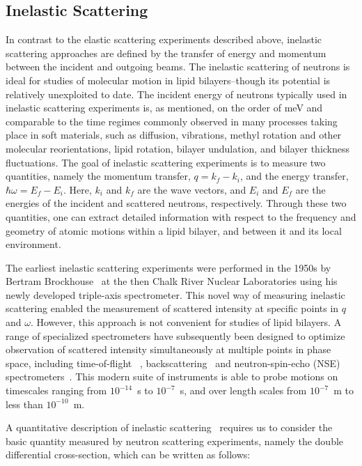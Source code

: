 \documentclass[8.5pt,twoside,twocolumn]{article}
\begin{document}
\subsection{Inelastic Scattering}\label{InES}
In contrast to the elastic scattering experiments described above, inelastic scattering approaches are defined by the transfer of energy and momentum between the incident and outgoing beams.  The inelastic scattering of neutrons is ideal for studies of molecular motion in lipid bilayers--though its potential is relatively unexploited to date. The incident energy of neutrons typically used in inelastic scattering experiments is, as mentioned, on the order of meV and comparable to the time regimes commonly observed in many processes taking place in soft materials, such as diffusion, vibrations, methyl rotation and other molecular reorientations, lipid rotation, bilayer undulation, and bilayer thickness fluctuations. The goal of inelastic scattering experiments is to measure two quantities, namely the momentum transfer, $q= k_f-k_i$, and the energy transfer, $\hbar\omega=E_f-E_i$.  Here, $k_i$ and $k_f$ are the wave vectors, and $E_i$ and $E_f$ are the energies of the incident and scattered neutrons, respectively. Through these two quantities, one can extract detailed information with respect to the frequency and geometry of atomic motions within a lipid bilayer, and between it and its local environment.  

The earliest inelastic scattering experiments were performed in the 1950s by Bertram Brockhouse~\cite{Brockhouse.1955} at the then Chalk River Nuclear Laboratories using his newly developed triple-axis spectrometer.  This novel way of measuring inelastic scattering enabled the measurement of scattered intensity at specific points in $q$ and $\omega$. However, this approach is not convenient for studies of lipid bilayers. A range of specialized spectrometers have subsequently been designed to optimize observation of scattered intensity simultaneously at multiple points in phase space, including time-of-flight ~\cite{Copley.1993}, backscattering~\cite{Maier.1966} and neutron-spin-echo (NSE) spectrometers~\cite{Mezei.1972}. This modern suite of instruments is able to probe motions on timescales ranging from $10^{-14}$~s to $10^{-7}$~s, and over length scales from $10^{-7}$~m to less than $10^{-10}$~m.

A quantitative description of inelastic scattering~\cite{VanHove.1954,Bee.1988,Gennes.1963} requires us to consider the basic quantity measured by neutron scattering experiments, namely the double differential cross-section, which can be written as follows: 
\end{document}
